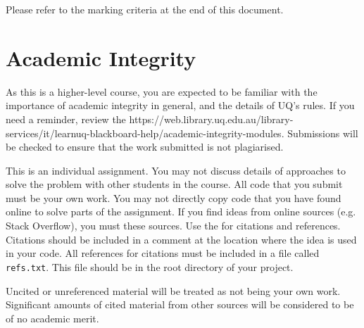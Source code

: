\documentclass{csse4400}
\begin{document}
Please refer to the marking criteria at the end of this document.


\section{Academic Integrity}
As this is a higher-level course, you are expected to be familiar with the importance of academic integrity in general, and the details of UQ's rules.
If you need a reminder, review the 
{https://web.library.uq.edu.au/library-services/it/learnuq-blackboard-help/academic-integrity-modules}.
Submissions will be checked to ensure that the work submitted is not plagiarised.

This is an individual assignment.
You may not discuss details of approaches to solve the problem with other students in the course.
All code that you submit must be your own work.
You may not directly copy code that you have found online to solve parts of the assignment.
If you find ideas from online sources (e.g. Stack Overflow), you must  these sources.
Use the  for citations and references.
Citations should be included in a comment at the location where the idea is used in your code.
All references for citations must be included in a file called \texttt{refs.txt}.
This file should be in the root directory of your project.

Uncited or unreferenced material will be treated as not being your own work.
Significant amounts of cited material from other sources will be considered to be of no academic merit.






\end{document}

